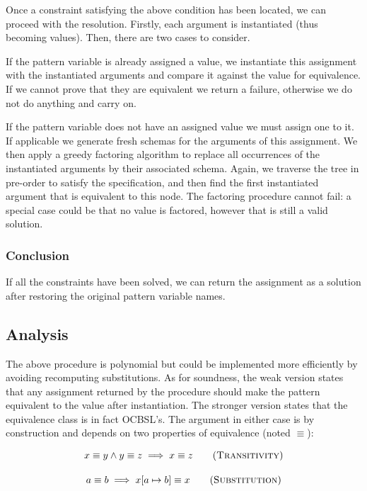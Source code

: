 Once a constraint satisfying the above condition has been located, we can proceed with the resolution. Firstly, each argument is instantiated (thus becoming values). Then, there are two cases to consider.

If the pattern variable is already assigned a value, we instantiate this assignment with the instantiated arguments and compare it against the value for equivalence. If we cannot prove that they are equivalent we return a failure, otherwise we do not do anything and carry on.

If the pattern variable does not have an assigned value we must assign one to it. If applicable we generate fresh schemas for the arguments of this assignment. We then apply a greedy factoring algorithm to replace all occurrences of the instantiated arguments by their associated schema. Again, we traverse the tree in pre-order to satisfy the specification, and then find the first instantiated argument that is equivalent to this node. The factoring procedure cannot fail: a special case could be that no value is factored, however that is still a valid solution.

\subsubsection{Conclusion}

If all the constraints have been solved, we can return the assignment as a solution after restoring the original pattern variable names.

\subsection{Analysis}

The above procedure is polynomial but could be implemented more efficiently by avoiding recomputing substitutions. As for soundness, the weak version states that any assignment returned by the procedure should make the pattern equivalent to the value after instantiation. The stronger version states that the equivalence class is in fact OCBSL's. The argument in either case is by construction and depends on two properties of equivalence (noted $\equiv$):

\begin{gather}
  {x \equiv y \land y \equiv z} \implies {x \equiv z} \tag{\textsc{Transitivity}} \\[1em]
  {a \equiv b} \implies {x[a \mapsto b] \equiv x} \tag{\textsc{Substitution}}
\end{gather}

